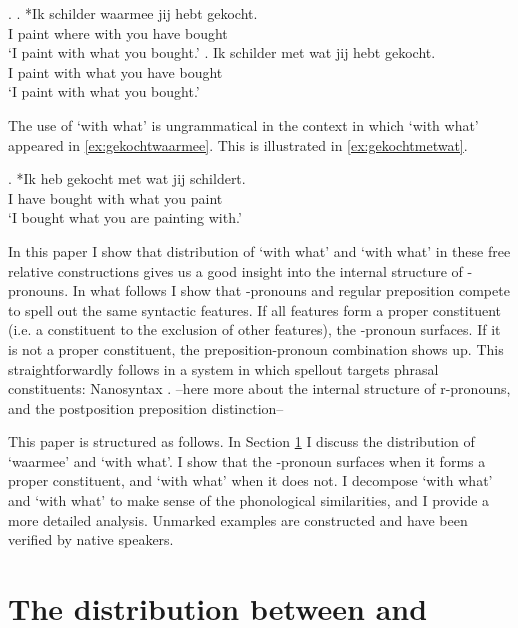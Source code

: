 \documentclass[12pt]{article}
\begin{document}
\ex.\label{ex:schildermet}
\ag. *Ik schilder waarmee jij hebt gekocht.\\
 I paint {where with} you have bought\\
 `I paint with what you bought.'\label{ex:schilderwaarmee}
\bg. Ik schilder met wat jij hebt gekocht.\\
 I paint with what you have bought\\
 `I paint with what you bought.'\label{ex:schildermetwat}

The use of  `with what' is ungrammatical in the context in which  `with what' appeared in \ref{ex:gekochtwaarmee}. This is illustrated in \ref{ex:gekochtmetwat}.

\exg. *Ik heb gekocht met wat jij schildert.\\
 I have bought with what you paint\\
 `I bought what you are painting with.'\label{ex:gekochtmetwat}

In this paper I show that distribution of  `with what' and  `with what' in these free relative constructions gives us a good insight into the internal structure of -pronouns. In what follows I show that -pronouns and regular preposition compete to spell out the same syntactic features. If all features form a proper constituent (i.e. a constituent to the exclusion of other features), the -pronoun surfaces. If it is not a proper constituent, the preposition-pronoun combination shows up. This straightforwardly follows in a system in which spellout targets phrasal constituents: Nanosyntax \citep{starke2009}. --here more about the internal structure of r-pronouns, and the postposition preposition distinction--

This paper is structured as follows. In Section \ref{sec:distribution} I discuss the distribution of  `waarmee' and  `with what'. I show that the -pronoun surfaces when it forms a proper constituent, and  `with what' when it does not. I decompose  `with what' and  `with what' to make sense of the phonological similarities, and I provide a more detailed analysis. Unmarked examples are constructed and have been verified by native speakers.


\section{The distribution between  and }\label{sec:distribution}
\end{document}
